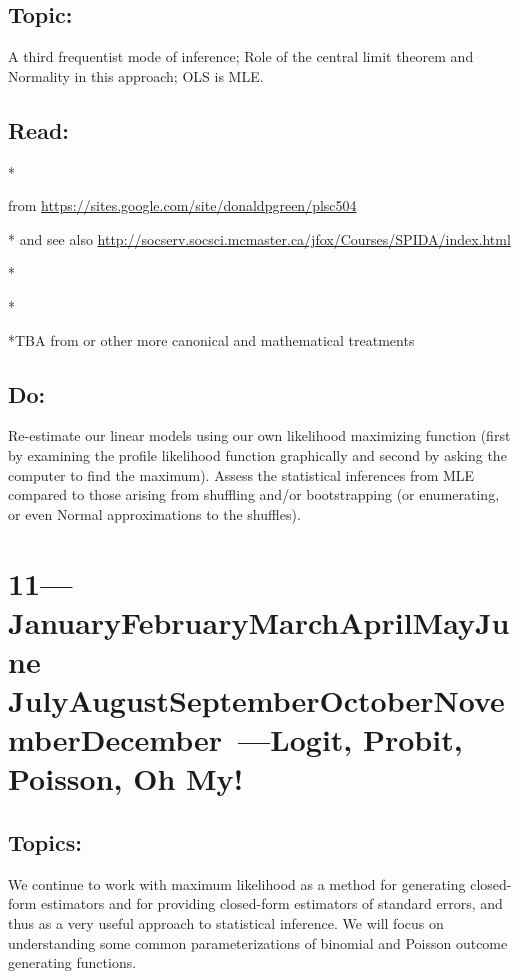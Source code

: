 \documentclass[10pt]{article}
\def\themonth{\ifcase\month\or
  January\or February\or March\or April\or May\or June\or
  July\or August\or September\or October\or November\or December\fi}
\begin{document}
\subsection{Topic:} A third frequentist mode of inference; Role of the
central limit theorem and Normality in this approach; OLS is MLE.

\subsection{Read:}
*\citealp[Chap 9.3.3]{fox2008applied}

\citealp[Use the 2009 Version of]{green1991mle}  from \url{https://sites.google.com/site/donaldpgreen/plsc504}

*\citealp[Chap 5]{fox2011r} and see also \url{http://socserv.socsci.mcmaster.ca/jfox/Courses/SPIDA/index.html}

*\citealp[Chap 4]{king89}

*\citealp[Chap 1,2]{Cox:2006}

*TBA from \citet{rice2007msd} or other more canonical and mathematical
treatments

\subsection{Do:} Re-estimate our linear models using our own
likelihood maximizing function (first by examining the profile
likelihood function graphically and second by asking the computer to
find the maximum). Assess the statistical inferences
from MLE compared to those arising from shuffling and/or bootstrapping
(or enumerating, or even Normal approximations to the shuffles).




\AdvanceDate[7]
\section{11---\themonth~\the\day---Logit, Probit, Poisson, Oh My!}

\subsection{Topics:} We continue to work with maximum likelihood as a
method for generating closed-form estimators and for providing
closed-form estimators of standard errors, and thus as a very useful
approach to statistical inference. We will focus on understanding some
common parameterizations of binomial and Poisson outcome generating
functions.
\end{document}
